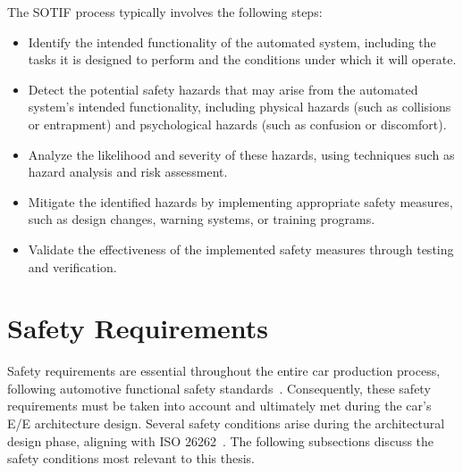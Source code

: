     The SOTIF process typically involves the following steps:
    \begin{itemize}
        \item  Identify the intended functionality of the automated system, including the tasks it is designed to perform and the conditions under which it will operate.
        \item  Detect the potential safety hazards that may arise from the automated system's intended functionality, including physical hazards (such as collisions or entrapment) and psychological hazards (such as confusion or discomfort).
        \item  Analyze the likelihood and severity of these hazards, using techniques such as hazard analysis and risk assessment.
        \item  Mitigate the identified hazards by implementing appropriate safety measures, such as design changes, warning systems, or training programs.
        \item  Validate the effectiveness of the implemented safety measures through testing and verification.
    \end{itemize}


     \section{Safety Requirements}
     
     
     Safety requirements are essential throughout the entire car production process, following automotive functional safety standards~\cite{iso26262,sotif}. Consequently, these safety requirements must be taken into account and ultimately met during the car's E/E architecture design. Several safety conditions arise during the architectural design phase, aligning with ISO 26262~\cite{iso26262}. The following subsections discuss the safety conditions most relevant to this thesis.
     
